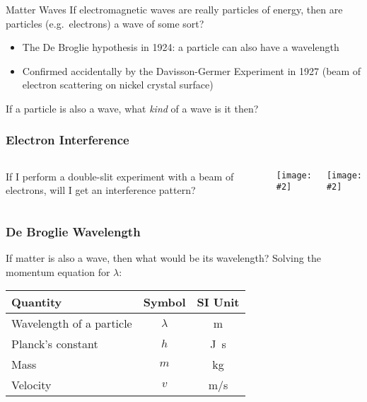 \documentclass[12pt,compress,aspectratio=169]{beamer}
\newcommand{\pic}[2]{\texttt{[image: \#2]}}
\newcommand{\eq}[2]{\vspace{#1}{\Large\begin{displaymath}#2\end{displaymath}}}
\begin{document}
\begin{frame}{Matter Waves}
  If electromagnetic waves are really particles of energy, then are particles
  (e.g.\ electrons) a wave of some sort?
  \begin{itemize}
  \item The De Broglie hypothesis in 1924: a particle can also have a
    wavelength
  \item Confirmed accidentally by the Davisson-Germer Experiment in 1927 (beam
    of electron scattering on nickel crystal surface)
  \end{itemize}

  \vspace{.1in}If a particle is also a wave, what \emph{kind} of a wave is it
  then?
\end{frame}



\begin{frame}
  \frametitle{Electron Interference}
  \begin{columns}
    If I perform a double-slit experiment with a beam of electrons, will I get
    an interference pattern?
    \begin{center}
      \pic{.7}{CNX_Chem_06_03_Electrnin.jpg}
    \end{center}

    \pic{1}{206px-Double-slit_experiment_results_Tanamura_2.jpg}
  \end{columns}
\end{frame}



\begin{frame}
  \frametitle{De Broglie Wavelength}
  If matter is also a wave, then what would be its wavelength? Solving the
  momentum equation for $\lambda$:

  \eq{-.2in}{
    p=\frac{h}{\lambda}\;\;\rightarrow\;\;
    \lambda=\frac{h}{p}\;\;\rightarrow\;\;\boxed{\lambda=\frac{h}{mv}}
  }

  \vspace{-.1in}
  \begin{center}
    \begin{tabular}{l|c|c}
      \rowcolor{pink}
      \textbf{Quantity} & \textbf{Symbol} & \textbf{SI Unit} \\ \hline
      Wavelength of a particle & $\lambda$ & \si{\metre} \\
      Planck's constant & $h$  & \si{\joule.\second} \\
      Mass              & $m$  & \si{\kilo\gram} \\
      Velocity          & $v$  & \si{\metre/\second}
    \end{tabular}
  \end{center}
\end{frame}
\end{document}
